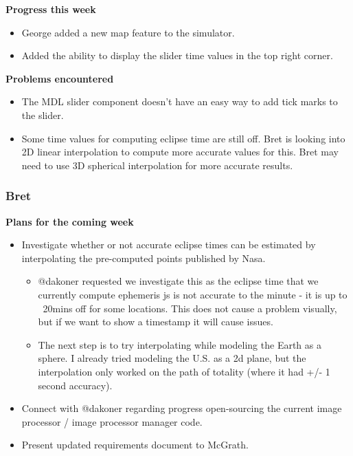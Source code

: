 \documentclass[10pt, onecolumn, draftclsnofoot, letterpaper, compsoc]{IEEEtran}
\begin{document}
    \noindent \textbf{Progress this week}

    \begin{itemize}

    \item George added a new map feature to the simulator.
    \item Added the ability to display the slider time values in the top right corner.

    \end{itemize}

    \noindent \textbf{Problems encountered}

    \begin{itemize}

    \item The MDL slider component doesn't have an easy way to add tick marks to the slider.
    \item Some time values for computing eclipse time are still off. Bret is looking
    into 2D linear interpolation to compute more accurate values for this. Bret may
    need to use 3D spherical interpolation for more accurate results.

    \end{itemize}

    \subsubsection{Bret}

    \noindent \textbf{Plans for the coming week}

    \begin{itemize}

    \item Investigate whether or not accurate eclipse times can be estimated by interpolating the pre-computed points
      published by Nasa.

        \begin{itemize}
          \item @dakoner requested we investigate this as the eclipse time that we currently compute
            ephemeris js is not accurate to the minute - it is up to ~20mins off for some locations. This does not
            cause a problem visually, but if we want to show a timestamp it will cause issues.
          \item The next step is to try interpolating while modeling the Earth as a sphere. I already tried modeling
            the U.S. as a 2d plane, but the interpolation only worked on the path of totality (where it had +/- 1
            second accuracy).
        \end{itemize}

    \item Connect with @dakoner regarding progress open-sourcing the current image processor / image processor manager
      code.
    \item Present updated requirements document to McGrath.

    \end{itemize}
\end{document}

